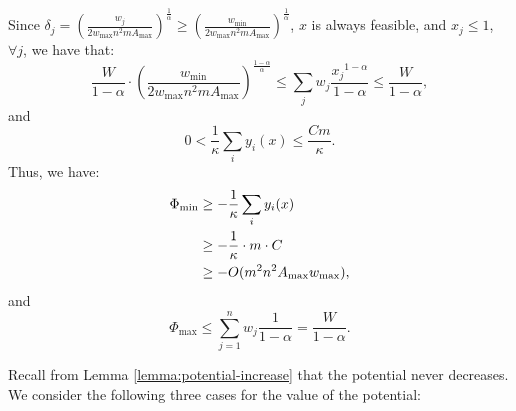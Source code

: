 \documentclass[11pt]{article}
\makeatletter
\newenvironment{proofof}[1]{\par
  \pushQED{\qed}\normalfont \topsep3\p@\relax
  \trivlist
  \item[\hskip\labelsep
        \bfseries
    Proof of #1\@addpunct{.}]\ignorespaces
}{\popQED\endtrivlist\@endpefalse
}
\makeatother
\begin{document}
\begin{proofof}{Theorem \ref{thm:convergence-alpha<1}}
Since $\delta_j = \left(\frac{w_{j}}{2w_{\max}n^2mA_{\max}}\right)^{\frac{1}{\alpha}}\geq \left(\frac{w_{\min}}{2w_{\max}n^2mA_{\max}}\right)^{\frac{1}{\alpha}}$, $x$ is always feasible, and $x_j\leq 1$, $\forall j$, we have that:
\begin{equation}
\frac{W}{1-\alpha}\cdot\left(\frac{w_{\min}}{2w_{\max}n^2mA_{\max}}\right)^{\frac{1-\alpha}{\alpha}}\leq\sum_j w_j \frac{{x_j}^{1-\alpha}}{1-\alpha}\leq \frac{W}{1-\alpha}, \label{eq:alpha<1-p-alpha-bound}
\end{equation}
and
\begin{equation}
0<\frac{1}{\kappa}\sum_i y_i(x)\leq \frac{Cm}{\kappa}. \label{eq:alpha<1-sum-yi-bound}
\end{equation}
Thus, we have:
\begin{align}
\Phi_{\min} &\geq -\frac{1}{\kappa}\sum_i y_i(x)\notag\\
&\geq -\frac{1}{\kappa}\cdot m\cdot C\notag\\
&\geq - O(m^2n^2 A_{\max}w_{\max}), \label{eq:alpha<1-phi-min}
\end{align}
and
\begin{equation}
\Phi_{\max} \leq \sum_{j=1}^n w_j \frac{1}{1-\alpha} = \frac{W}{1-\alpha}. \label{eq:alpha<1-phi-max}
\end{equation}

Recall from Lemma \ref{lemma:potential-increase} that the potential never decreases. We consider the following three cases for the value of the potential:


\end{proofof}
\end{document}
